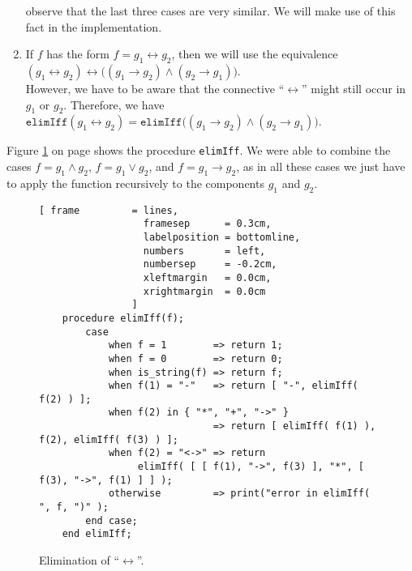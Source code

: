 \begin{enumerate}
      observe that the last three cases are very similar.  We will make use of this fact in the
      implementation. 
\item If  $f$ has the form $f = g_1 \leftrightarrow g_2$, then we will use the equivalence
      \\[0.2cm]
      \hspace*{1.3cm} 
      $(g_1 \leftrightarrow g_2) \leftrightarrow \bigl( (g_1 \rightarrow g_2) \wedge (g_2 \rightarrow g_1)\bigr)$.
      \\[0.2cm]
      However, we have to be aware that the connective ``$\leftrightarrow$'' might still
      occur in $g_1$ or $g_2$.  Therefore, we have
      \\[0.2cm]
      \hspace*{1.3cm} 
      $\mathtt{elimIff}(g_1 \leftrightarrow g_2) = 
       \mathtt{elimIff}\bigl( (g_1 \rightarrow g_2) \wedge (g_2 \rightarrow g_1)\bigr)$. 
\end{enumerate}
Figure
\ref{fig:eliminate-gdw} on page \pageref{fig:eliminate-gdw} shows the procedure \texttt{elimIff}.
We were able to  combine the cases $f = g_1 \wedge g_2$, $f = g_1 \vee g_2$, and $f = g_1
\rightarrow g_2$, as in all these cases we just have to apply the function recursively to the
components $g_1$ and $g_2$.


\begin{figure}[!ht]
  \centering
\begin{Verbatim}[ frame         = lines, 
                  framesep      = 0.3cm, 
                  labelposition = bottomline,
                  numbers       = left,
                  numbersep     = -0.2cm,
                  xleftmargin   = 0.0cm,
                  xrightmargin  = 0.0cm
                ]
    procedure elimIff(f);
        case
            when f = 1        => return 1;
            when f = 0        => return 0;
            when is_string(f) => return f;
            when f(1) = "-"   => return [ "-", elimIff( f(2) ) ];
            when f(2) in { "*", "+", "->" } 
                              => return [ elimIff( f(1) ), f(2), elimIff( f(3) ) ];
            when f(2) = "<->" => return 
                 elimIff( [ [ f(1), "->", f(3) ], "*", [ f(3), "->", f(1) ] ] );
            otherwise         => print("error in elimIff( ", f, ")" );
        end case;
    end elimIff;
\end{Verbatim}
\vspace*{-0.3cm}
  \caption{Elimination of ``$\leftrightarrow$''.}
  \label{fig:eliminate-gdw}
\end{figure} 

